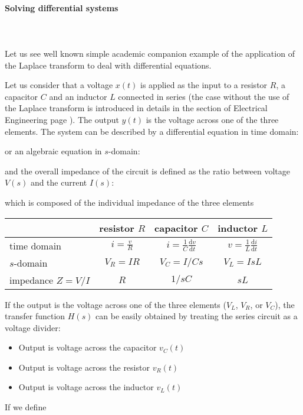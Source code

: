 	\paragraph{Solving differential systems}\mbox{}\\\\
	 Let us see well known simple academic companion example of the application of the Laplace transform to deal with differential equations.
	 
	 Let us consider that a voltage $x(t)$ is applied as the input to a resistor $R$, a capacitor $C$ and an inductor $L$ connected in series (the case without the use of the Laplace transform is introduced in details in the section of Electrical Engineering page \pageref{rlc circuit}). The output $y(t)$ is the voltage across one of the three elements. The system can be described by a differential equation in time domain:
	
	or an algebraic equation in $s$-domain:
	
	and the overall impedance of the circuit is defined as the ratio between voltage $V(s)$ and the current $I(s)$:
	
	which is composed of the individual impedance of the three elements
	

	\begin{table}[H]
		\centering
		\begin{tabular}{l|c|c|c} \hline
			& resistor $R$ & capacitor $C$ & inductor $L$  \\ \hline
		time domain & $i=\frac{v}{R}$ & $i=\frac{1}{C}\frac{\mathrm{d}v}{\mathrm{d}t}$ & $v=\frac{1}{L}\frac{\mathrm{d}i}{\mathrm{d}t}$ 
		\\ \hline 
		$s$-domain    & $V_R=IR$ & $V_C=I/Cs$ & $V_L=IsL$	\\ \hline
		impedance $Z=V/I$   &    $R$   &   $1/sC$   &   $sL$    \\ \hline
		\end{tabular}
	\end{table}	
	If the output is the voltage across one of the three elements ($V_L$, $V_R$, or $V_C$), the transfer function $H(s)$ can be easily obtained by treating the series circuit as a voltage divider: 
	\begin{itemize}
		\item Output is voltage across the capacitor $v_C(t)$
		
		\item Output is voltage across the resistor $v_R(t)$
		
		\item Output is voltage across the inductor $v_L(t)$
		
	\end{itemize}
	If we define
	

